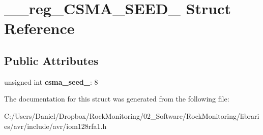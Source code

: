 \hypertarget{struct____reg___c_s_m_a___s_e_e_d__0}{}\section{\+\_\+\+\_\+reg\+\_\+\+C\+S\+M\+A\+\_\+\+S\+E\+E\+D\+\_ Struct Reference}
\label{struct____reg___c_s_m_a___s_e_e_d__0}
\subsection*{Public Attributes}
\begin{DoxyCompactItemize}
\item 
unsigned int {\bfseries csma\+\_\+seed\+\_}\+: 8\hypertarget{struct____reg___c_s_m_a___s_e_e_d__0_a4d0e74bb3ca9ff8bd9508858f8d8c534}{}\label{struct____reg___c_s_m_a___s_e_e_d__0_a4d0e74bb3ca9ff8bd9508858f8d8c534}

\end{DoxyCompactItemize}


The documentation for this struct was generated from the following file\+:\begin{DoxyCompactItemize}
\item 
C\+:/\+Users/\+Daniel/\+Dropbox/\+Rock\+Monitoring/02\+\_\+\+Software/\+Rock\+Monitoring/libraries/avr/include/avr/iom128rfa1.\+h\end{DoxyCompactItemize}
